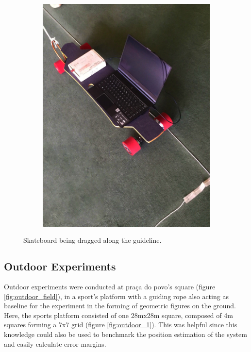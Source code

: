 \begin{figure}
\begin{subfigure}{0.49\textwidth}
        \includegraphics[width=1\textwidth]{figures/indoor_2.jpg}
    \end{subfigure}
    \caption{Skateboard being dragged along the guideline.}
    \label{fig:indoor_experiment}
\end{figure}

\newpage

\subsection{Outdoor Experiments}

Outdoor experiments were conducted at praça do povo’s square (figure \ref{fig:outdoor_field}), in a sport’s platform with a guiding rope also acting as baseline for the experiment in the forming of geometric figures on the ground. Here, the sports platform consisted of one 28mx28m square, composed of 4m squares forming a 7x7 grid (figure \ref{fig:outdoor_1}). This was helpful since this knowledge could also be used to benchmark the position estimation of the system and easily calculate error margins.

